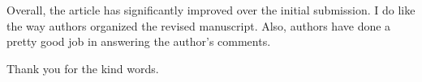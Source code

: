 \begin{reviewer}
Overall, the article has significantly improved over the initial submission. I
do like the way authors organized the revised manuscript. Also, authors have
done a pretty good job in answering the author's comments.
\end{reviewer}

\begin{authors}
Thank you for the kind words.
\end{authors}
